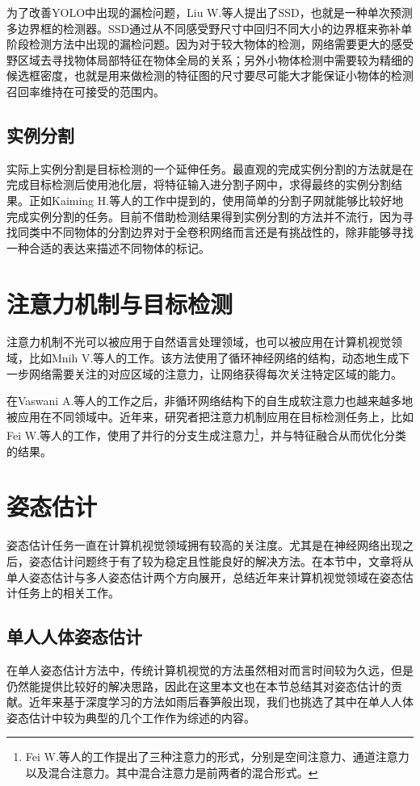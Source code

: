 为了改善YOLO中出现的漏检问题，Liu W.等人提出了SSD\cite{liu2016ssd}，也就是一种单次预测多边界框的检测器。SSD通过从不同感受野尺寸中回归不同大小的边界框来弥补单阶段检测方法中出现的漏检问题。因为对于较大物体的检测，网络需要更大的感受野区域去寻找物体局部特征在物体全局的关系；另外小物体检测中需要较为精细的候选框密度，也就是用来做检测的特征图的尺寸要尽可能大才能保证小物体的检测召回率维持在可接受的范围内。

\subsection{实例分割}
\label{subsec:insseg}
实际上实例分割是目标检测的一个延伸任务。最直观的完成实例分割的方法就是在完成目标检测后使用池化层，将特征输入进分割子网中，求得最终的实例分割结果。正如Kaiming H.等人\cite{He2017Mask}的工作中提到的，使用简单的分割子网就能够比较好地完成实例分割的任务。目前不借助检测结果得到实例分割的方法并不流行，因为寻找同类中不同物体的分割边界对于全卷积网络而言还是有挑战性的，除非能够寻找一种合适的表达来描述不同物体的标记。

\section{注意力机制与目标检测}
\label{sec:attenandobjdet}
注意力机制不光可以被应用于自然语言处理领域，也可以被应用在计算机视觉领域，比如Mnih V.等人的工作\cite{mnih2014recurrent}。该方法使用了循环神经网络的结构，动态地生成下一步网络需要关注的对应区域的注意力，让网络获得每次关注特定区域的能力。

在Vaswani A.等人的工作\cite{vaswani2017attention}之后，非循环网络结构下的自生成软注意力也越来越多地被应用在不同领域中。近年来，研究者把注意力机制应用在目标检测任务上，比如Fei W.等人的工作\cite{wang2017residual}，使用了并行的分支生成注意力\footnote{Fei W.等人的工作提出了三种注意力的形式，分别是空间注意力、通道注意力以及混合注意力。其中混合注意力是前两者的混合形式。}，并与特征融合从而优化分类的结果。

\section{姿态估计}
\label{sec:poseestimation}
姿态估计任务一直在计算机视觉领域拥有较高的关注度。尤其是在神经网络出现之后，姿态估计问题终于有了较为稳定且性能良好的解决方法。在本节中，文章将从单人姿态估计与多人姿态估计两个方向展开，总结近年来计算机视觉领域在姿态估计任务上的相关工作。
\subsection{单人人体姿态估计}
\label{subsec:singlepose}
在单人姿态估计方法中，传统计算机视觉的方法虽然相对而言时间较为久远，但是仍然能提供比较好的解决思路，因此在这里本文也在本节总结其对姿态估计的贡献。近年来基于深度学习的方法如雨后春笋般出现，我们也挑选了其中在单人人体姿态估计中较为典型的几个工作作为综述的内容。
